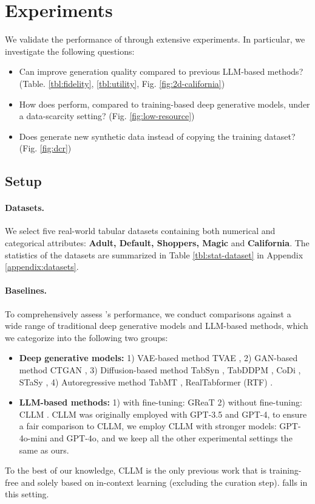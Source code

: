 \section{Experiments}
\label{experiments}
We validate the performance of \modelname through extensive experiments. In particular, we investigate the following questions:
\begin{itemize}[leftmargin=*]
    \item Can \modelname improve generation quality compared to previous LLM-based methods? (Table. \ref{tbl:fidelity}, \ref{tbl:utility}, Fig. \ref{fig:2d-california})
    \item How does \modelname perform, compared to training-based deep generative models, under a data-scarcity setting? (Fig. \ref{fig:low-resource})
    \item Does \modelname generate new synthetic data instead of copying the training dataset? (Fig. \ref{fig:dcr})
\end{itemize}

\subsection{Setup}
\paragraph{Datasets.}
We select five real-world tabular datasets containing both numerical and categorical attributes: \textbf{Adult, Default, Shoppers, Magic} and \textbf{California}. The statistics of the datasets are summarized in Table \ref{tbl:stat-dataset} in Appendix \ref{appendix:datasets}.

\paragraph{Baselines.}
To comprehensively assess \modelname's performance, we conduct comparisons against a wide range of traditional deep generative models and LLM-based methods, which we categorize into the following two groups:
\begin{itemize}[leftmargin=*]
    \item \textbf{Deep generative models:} 1) VAE-based method TVAE \citep{ctgan}, 2) GAN-based method CTGAN \citep{ctgan}, 3) Diffusion-based method TabSyn \citep{tabsyn}, TabDDPM \citep{tabddpm}, CoDi \citep{codi}, STaSy \citep{stasy}, 4) Autoregressive method TabMT \citep{tabmt}, RealTabformer (RTF) \citep{realtabformer}.
    \item \textbf{LLM-based methods:} 1) with fine-tuning: GReaT \citep{great} 2) without fine-tuning: CLLM \cite{cllm}. CLLM was originally employed with GPT-3.5 and GPT-4, to ensure a fair comparison to CLLM, we employ CLLM with stronger models: GPT-4o-mini and GPT-4o, and we keep all the other experimental settings the same as ours.
\end{itemize}
To the best of our knowledge, CLLM \cite{cllm} is the only previous work that is training-free and solely based on in-context learning (excluding the curation step). \modelname falls in this setting.

